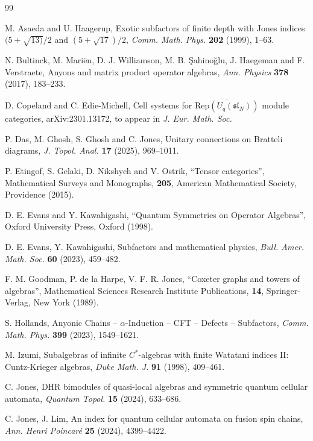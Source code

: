 \documentclass[12pt]{article}
\begin{document}
\begin{thebibliography}{99}  

 M. Asaeda and U. Haagerup,
Exotic subfactors of finite depth with Jones indices 
$(5+\sqrt{13)}/2$ and $(5+\sqrt{17})/2$,
\textit{Comm. Math. Phys.} {\bf 202} (1999), 1--63.

N. Bultinck, M. Mari\"en, D. J. Williamson, M. B. \c Sahino\u glu,
J. Haegeman and F. Verstraete,
Anyons and matrix product operator algebras,
\textit{Ann. Physics} {\bf 378} (2017), 183--233. 

D. Copeland and C. Edie-Michell,
Cell systems for $\overline{\mathrm{Rep}(U_q(\mathfrak{sl}_N))}$ module
categories, arXiv:2301.13172, to appear in 
\textit{J. Eur. Math. Soc.}

P. Das, M. Ghosh, S. Ghosh and C. Jones,
Unitary connections on Bratteli diagrams,
\textit{J. Topol. Anal.} {\bf 17} (2025), 969--1011.

 P. Etingof, S. Gelaki, D. Nikshych
and V. Ostrik, ``Tensor categories'', 
Mathematical Surveys and Monographs, {\bf 205},
American Mathematical Society, Providence (2015).

 D. E. Evans and Y. Kawahigashi,
``Quantum Symmetries on Operator Algebras'',
Oxford University Press, Oxford (1998).

  D. E. Evans, Y. Kawahigashi,
Subfactors and mathematical physics,
\textit{Bull. Amer. Math. Soc.} {\bf 60} (2023), 459--482.

F. M. Goodman, P. de la Harpe, V. F. R. Jones,
``Coxeter graphs and towers of algebras'',
Mathematical Sciences Research Institute Publications, {\bf 14},
Springer-Verlag, New York (1989).

S. Hollands,
Anyonic Chains -- $\alpha$-Induction -- CFT -- Defects -- Subfactors,
\textit{Comm. Math. Phys.} {\bf 399} (2023), 1549--1621.

M. Izumi,
Subalgebras of infinite $C^*$-algebras with
finite Watatani indices II: Cuntz-Krieger algebras,
\textit{Duke Math. J.} {\bf 91} (1998), 409--461.

C. Jones,
DHR bimodules of quasi-local algebras and symmetric 
quantum cellular automata,
\textit{Quantum Topol.} {\bf 15} (2024), 633--686.

C. Jones, J. Lim, 
An index for quantum cellular automata on fusion spin chains,
\textit{Ann. Henri Poincar\'e} {\bf 25} (2024), 4399--4422.


\end{thebibliography}
\end{document}
